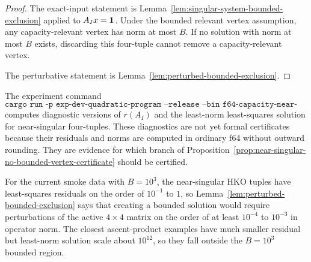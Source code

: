 \begin{proof}
The exact-input statement is Lemma~\ref{lem:singular-system-bounded-exclusion}
applied to $A_Ix=\mathbf{1}$.  Under the bounded relevant vertex assumption, any
capacity-relevant vertex has norm at most $B$.  If no solution with norm at most
$B$ exists, discarding this four-tuple cannot remove a capacity-relevant vertex.

The perturbative statement is Lemma~\ref{lem:perturbed-bounded-exclusion}.
\end{proof}

\begin{remark}
\label{rem:f64-near-singular-experiment}
The experiment command
\[
  \texttt{cargo run -p exp-dev-quadratic-program --release --bin f64-capacity-near-singular}
\]
computes diagnostic versions of $r(A_I)$ and the least-norm least-squares
solution for near-singular four-tuples.  These diagnostics are not yet formal
certificates because their residuals and norms are computed in ordinary f64
without outward rounding.  They are evidence for which branch of
Proposition~\ref{prop:near-singular-no-bounded-vertex-certificate} should be
certified.

For the current smoke data with $B=10^3$, the near-singular HKO tuples have
least-squares residuals on the order of $10^{-1}$ to $1$, so
Lemma~\ref{lem:perturbed-bounded-exclusion} says that creating a bounded
solution would require perturbations of the active $4\times4$ matrix on the
order of at least $10^{-4}$ to $10^{-3}$ in operator norm.  The closest
ascent-product examples have much smaller residual but least-norm solution
scale about $10^{12}$, so they fall outside the $B=10^3$ bounded region.
\end{remark}
